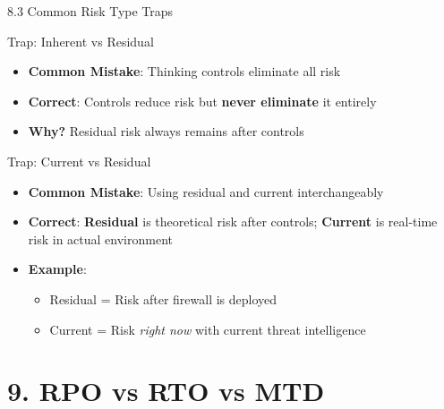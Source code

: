 \documentclass{beamer}
\begin{document}
	\begin{frame}{8.3 Common Risk Type Traps}
		\begin{block}{Trap: Inherent vs Residual}
			\begin{itemize}
				\item \textbf{Common Mistake}: Thinking controls eliminate all risk
				\item \textbf{Correct}: Controls reduce risk but \textbf{never eliminate} it entirely
				\item \textbf{Why?} Residual risk always remains after controls
			\end{itemize}
		\end{block}
		
		\begin{block}{Trap: Current vs Residual}
			\begin{itemize}
				\item \textbf{Common Mistake}: Using residual and current interchangeably
				\item \textbf{Correct}: \textbf{Residual} is theoretical risk after controls; \textbf{Current} is real-time risk in actual environment
				\item \textbf{Example}: 
				\begin{itemize}
					\item Residual = Risk after firewall is deployed
					\item Current = Risk \textit{right now} with current threat intelligence
				\end{itemize}
			\end{itemize}
		\end{block}
	\end{frame}
	
	\section{9. RPO vs RTO vs MTD}
	
\end{document}
